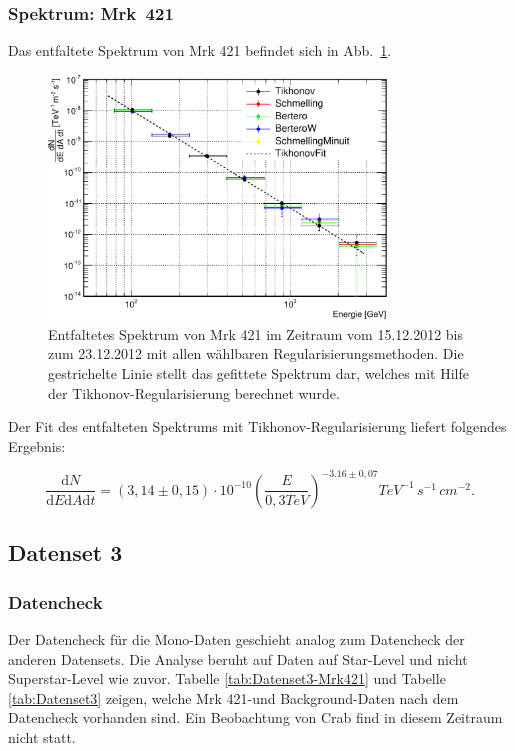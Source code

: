 \subsubsection{Spektrum: Mrk~421}
Das entfaltete Spektrum von Mrk 421 befindet sich in Abb.~\ref{Datenset4_Spektrum_Mrk421}.

\begin{figure}
    \centering
    \includegraphics[width=0.8\textwidth]{./Plots/04_MrkAnalyse/Datenset4/Datenset4_Spektrum_Mrk421.pdf}
    \caption{Entfaltetes Spektrum von Mrk 421 im Zeitraum vom 15.12.2012 bis zum 23.12.2012 mit allen wählbaren Regularisierungsmethoden.
    Die gestrichelte Linie stellt das gefittete Spektrum dar, welches mit Hilfe der Tikhonov-Regularisierung berechnet wurde.}
    \label{Datenset4_Spektrum_Mrk421}
\end{figure}

Der Fit des entfalteten Spektrums mit Tikhonov-Regularisierung liefert folgendes Ergebnis:

\begin{equation}
 \frac{\mathrm{d}N}{\mathrm{d}E\mathrm{d}A\mathrm{d}t}=(3,14 \pm 0,15) \cdot 10^{-10}\left( \frac{E}{0,3 \si{TeV}} \right)^{-3.16\pm 0,07} \si{TeV^{-1}\,s^{-1}\,cm^{-2}}.
\end{equation}


\FloatBarrier

\subsection{Datenset 3}
\label{subsec:Datenset_3}

\subsubsection{Datencheck}
Der Datencheck für die Mono-Daten geschieht analog zum Datencheck der anderen Datensets.
Die Analyse beruht auf Daten auf Star-Level und nicht Superstar-Level wie zuvor.
Tabelle \ref{tab:Datenset3-Mrk421} und Tabelle \ref{tab:Datenset3} zeigen, welche Mrk 421-und Background-Daten nach dem Datencheck vorhanden sind.
Ein Beobachtung von Crab find in diesem Zeitraum nicht statt.

